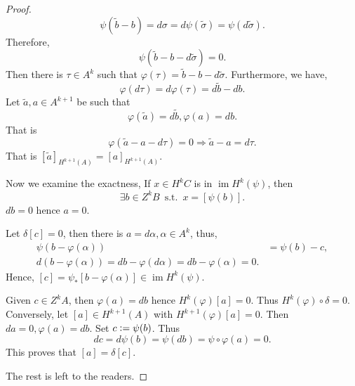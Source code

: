 \documentclass[10pt]{article}
\DeclareMathOperator{\straw}{s.t.}
\DeclareMathOperator{\image}{im}
\newcommand{\defeq}{\vcentcolon=}
\newcommand{\st}[0]{\:\straw\:}
\begin{document}
\begin{proof}
\begin{equation*}
    \psi(\tilde{b}-b) = d\sigma = d\psi(\tilde{\sigma}) = \psi(d\tilde{\sigma}).
  \end{equation*}
  Therefore,
  \begin{equation*}
    \psi(\tilde{b}-b-d\tilde{\sigma})=0.
  \end{equation*}
  Then there is $\tau\in A^k$ such that $\varphi(\tau) = \tilde{b}-b-d\tilde{\sigma}$. Furthermore, we have,
  \begin{equation*}
    \varphi(d\tau) = d\varphi(\tau)=d\tilde{b}-db.
  \end{equation*}
  Let $\tilde{a},a\in A^{k+1}$ be such that 
  \begin{equation*}
    \varphi(\tilde{a}) = d\tilde{b},\varphi(a) = db.
  \end{equation*}
  That is 
  \begin{equation*}
    \varphi(\tilde{a}-a-d\tau) = 0\Rightarrow \tilde{a}-a = d\tau.
  \end{equation*}
  That is $[\tilde{a}]_{H^{k+1}(A)} = [a]_{H^{k+1}(A)}$. 
  \par Now we examine the exactness,
  If $x\in H^kC$ is in $\image H^k(\psi)$, then 
  \begin{equation*}
    \exists b\in Z^kB\st x=[\psi(b)].
  \end{equation*}
  $db=0$ hence $a=0$.
  \par Let $\delta[c]=0$, then there is $a=d\alpha,\alpha\in A^k$, thus,
  \begin{align*}
    \psi(b-\varphi(\alpha))&=\psi(b)-c,\\
    d(b-\varphi(\alpha))=db-\varphi(d\alpha)=db-\varphi(\alpha)=0.
  \end{align*}
  Hence, $[c]=\psi_*[b-\varphi(\alpha)]\in \image H^k(\psi)$.
  \par Given $c\in Z^kA$, then $\varphi(a)=db$ hence $H^k(\varphi)[a]=0$. Thus $H^k(\varphi)\circ\delta=0$.
  Conversely, let $[a]\in H^{k+1}(A)$ with $H^{k+1}(\varphi)[a]=0$. Then $da = 0,\varphi(a) = db$. Set $c\defeq\psi(b)$. Thus 
  \begin{equation*}
    dc = d\psi(b)=\psi(db)=\psi\circ\varphi(a)=0.
  \end{equation*}
  This proves that $[a]=\delta[c]$.
  \par The rest is left to the readers.
\end{proof}
\end{document}
